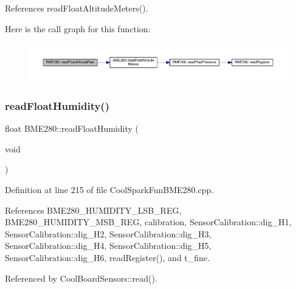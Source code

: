 References read\+Float\+Altitude\+Meters().

Here is the call graph for this function\+:
\nopagebreak
\begin{figure}[H]
\begin{center}
\leavevmode
\includegraphics[width=350pt]{df/dcf/class_b_m_e280_a6525c8a26f887b52596c86bed99343cb_cgraph}
\end{center}
\end{figure}
\mbox{\label{class_b_m_e280_a42ea7232039eebf5aadb391ef6132c35}} 
\subsubsection{\texorpdfstring{read\+Float\+Humidity()}{readFloatHumidity()}}
{\footnotesize\ttfamily float B\+M\+E280\+::read\+Float\+Humidity (\begin{DoxyParamCaption}\item[{void}]{ }\end{DoxyParamCaption})}



Definition at line 215 of file Cool\+Spark\+Fun\+B\+M\+E280.\+cpp.



References B\+M\+E280\+\_\+\+H\+U\+M\+I\+D\+I\+T\+Y\+\_\+\+L\+S\+B\+\_\+\+R\+EG, B\+M\+E280\+\_\+\+H\+U\+M\+I\+D\+I\+T\+Y\+\_\+\+M\+S\+B\+\_\+\+R\+EG, calibration, Sensor\+Calibration\+::dig\+\_\+\+H1, Sensor\+Calibration\+::dig\+\_\+\+H2, Sensor\+Calibration\+::dig\+\_\+\+H3, Sensor\+Calibration\+::dig\+\_\+\+H4, Sensor\+Calibration\+::dig\+\_\+\+H5, Sensor\+Calibration\+::dig\+\_\+\+H6, read\+Register(), and t\+\_\+fine.



Referenced by Cool\+Board\+Sensors\+::read().

